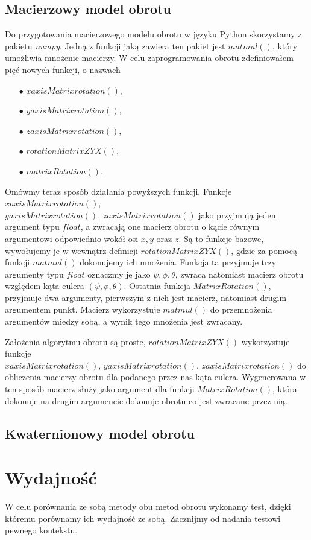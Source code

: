 \documentclass[a4paper,twoside,11pt,reqno]{mwrep}
\theoremstyle{plain} \newtheorem{twr}{Twierdzenie}
\theoremstyle{plain} \newtheorem{lem}{Lemat}
\theoremstyle{definition} \newtheorem{defi}{Definicja}
\theoremstyle{remark} \newtheorem*{wni}{Wniosek}
\theoremstyle{definition} \newtheorem{uwaga}{Uwaga}
\theoremstyle{definition}\newtheorem{prz}{Przykład}
\begin{document}
\subsection{Macierzowy model obrotu}
Do przygotowania macierzowego modelu obrotu w języku Python skorzystamy z pakietu \textit{numpy}. 
Jedną z funkcji jaką zawiera ten pakiet jest $matmul()$, który umożliwia mnożenie macierzy. 
W celu zaprogramowania obrotu zdefiniowałem pięć nowych funkcji, o nazwach
\begin{itemize}
\item[$\bullet$] $xaxisMatrixrotation()$,
\item[$\bullet$] $yaxisMatrixrotation()$,
\item[$\bullet$] $zaxisMatrixrotation()$,
\item[$\bullet$] $rotationMatrixZYX()$,
\item[$\bullet$] $matrixRotation()$.
\end{itemize} 
Omówmy teraz sposób działania powyższych funkcji. Funkcje $xaxisMatrixrotation()$,\\
$yaxisMatrixrotation()$,
$zaxisMatrixrotation()$ jako przyjmują jeden argument typu $float$, a zwracają one macierz obrotu o kącie równym
argumentowi odpowiednio wokół osi $x,y$ oraz $z$. Są to funkcje bazowe, wywołujemy je w wewnątrz definicji
$rotationMatrixZYX()$, gdzie za pomocą funkcji $matmul()$ dokonujemy ich mnożenia. Funkcja ta przyjmuje trzy argumenty
typu $float$ oznaczmy je jako $\psi,\phi,\theta$, zwraca natomiast macierz obrotu względem kąta eulera $(\psi,\phi,\theta)$.
Ostatnia funkcja $MatrixRotation()$, przyjmuje dwa argumenty, pierwszym z nich jest macierz, natomiast drugim argumentem 
punkt. Macierz wykorzystuje $matmul()$ do przemnożenia argumentów miedzy sobą, a wynik tego mnożenia jest zwracany.

Założenia algorytmu obrotu są proste, $rotationMatrixZYX()$ wykorzystuje funkcje\\
$xaxisMatrixrotation()$, $yaxisMatrixrotation()$, $zaxisMatrixrotation()$ do obliczenia 
macierzy obrotu dla podanego przez nas kąta eulera. Wygenerowana w ten sposób macierz służy jako argument
dla funkcji $MatrixRotation()$, która dokonuje na drugim argumencie dokonuje obrotu co jest zwracane przez nią.
\subsection{Kwaternionowy model obrotu}
\section{Wydajność}
W celu porównania ze sobą metody obu metod obrotu wykonamy test, dzięki któremu porównamy ich wydajność ze sobą. Zacznijmy od nadania testowi pewnego kontekstu.
\end{document}
